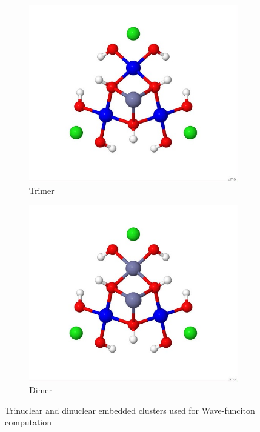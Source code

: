 \documentclass[12pt]{report}
\numberwithin{equation}{section}
\begin{document}
\begin{figure}
    \centering
    \begin{subfigure}{.5\textwidth}
      \centering
      \includegraphics[width=\linewidth]{Images/Trimere.jpg}
      \caption{Trimer}
      \label{fig:subtrimer}
    \end{subfigure}%
    \begin{subfigure}{.5\textwidth}
      \centering
      \includegraphics[width=\linewidth]{Images/Dimer.jpg}
      \caption{Dimer}
      \label{fig:subdimer}
    \end{subfigure}
    \caption{Trinuclear and dinuclear embedded clusters used for Wave-funciton computation}
    \label{fig:FragmentWF}
    \end{figure}
\end{document}
